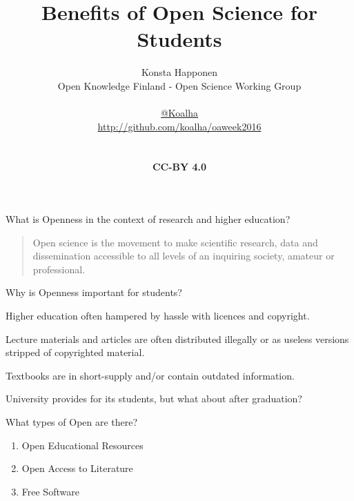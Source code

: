 \documentclass{beamer}
\title{Benefits of Open Science for Students}
\author{\parbox{\textwidth}{Konsta Happonen\\
    Open Knowledge Finland - Open Science Working Group\\
    \\
    \href{http://twitter.com/koalha}{@Koalha}\\
    \url{http://github.com/koalha/oaweek2016}}\\
    \\
    \textbf{CC-BY 4.0}
}
\date{}
\begin{document}
\maketitle


\begin{frame}{What is Openness in the context of research and higher education?}

  \begin{quote}
    Open science is the movement to make scientific research, data and dissemination accessible to all levels of an inquiring society, amateur or professional.\\
  \end{quote}

\end{frame}

\begin{frame}{Why is Openness important for students?}

  Higher education often hampered by hassle with licences and copyright.

  Lecture materials and articles are often distributed illegally or as useless versions stripped of copyrighted material.

  Textbooks are in short-supply and/or contain outdated information.

  University provides for its students, but what about after graduation?

\end{frame}

\begin{frame}{What types of Open are there?}
  \begin{enumerate}
  \item Open Educational Resources
  \item Open Access to Literature
  \item Free Software
  \end{enumerate}
\end{frame}
\end{document}
